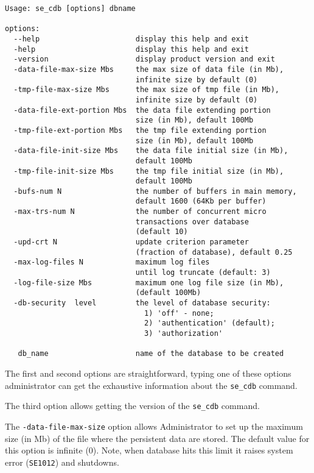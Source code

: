 \documentclass[a4paper,12pt]{article}
\begin{document}
\small{
\begin{verbatim}
Usage: se_cdb [options] dbname

options:
  --help                      display this help and exit
  -help                       display this help and exit
  -version                    display product version and exit
  -data-file-max-size Mbs     the max size of data file (in Mb),
                              infinite size by default (0)
  -tmp-file-max-size Mbs      the max size of tmp file (in Mb),
                              infinite size by default (0)
  -data-file-ext-portion Mbs  the data file extending portion
                              size (in Mb), default 100Mb
  -tmp-file-ext-portion Mbs   the tmp file extending portion
                              size (in Mb), default 100Mb
  -data-file-init-size Mbs    the data file initial size (in Mb),
                              default 100Mb
  -tmp-file-init-size Mbs     the tmp file initial size (in Mb),
                              default 100Mb
  -bufs-num N                 the number of buffers in main memory,
                              default 1600 (64Kb per buffer)
  -max-trs-num N              the number of concurrent micro
                              transactions over database
                              (default 10)
  -upd-crt N                  update criterion parameter
                              (fraction of database), default 0.25
  -max-log-files N            maximum log files
                              until log truncate (default: 3)
  -log-file-size Mbs          maximum one log file size (in Mb),
                              (default 100Mb)
  -db-security  level         the level of database security:
                                1) 'off' - none;
                                2) 'authentication' (default);
                                3) 'authorization'

   db_name                    name of the database to be created
\end{verbatim}}

The first and second options are straightforward, typing one of these options
administrator can get the exhaustive information about the \verb!se_cdb!
command.

The third option allows getting the version of the \verb!se_cdb! command.

The \verb!-data-file-max-size! option allows Administrator to set up the maximum
size (in Mb) of the file where the persistent data are stored. The default value
for this option is infinite (0). Note, when database hits this limit it raises
system error (\verb!SE1012!) and shutdowns.
\end{document}
